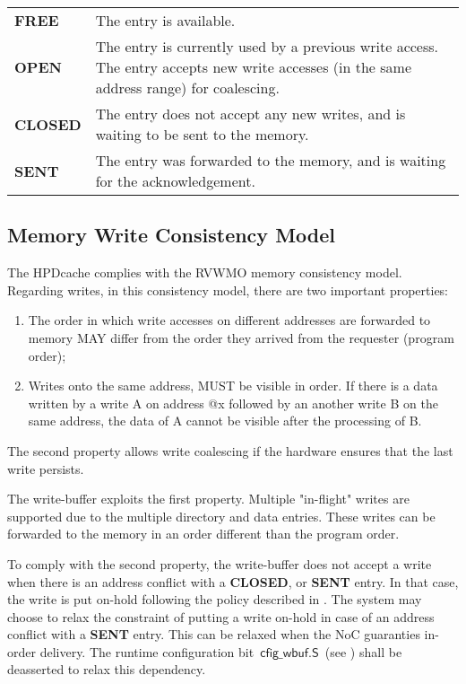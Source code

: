 \documentclass[10pt,titlepage,twoside]{book}
\begin{document}
\begin{center}
\begin{tabular}{lp{.8\linewidth}}
\textbf{FREE}   & The entry is available. \\
\textbf{OPEN}   & The entry is currently used by a previous write access.
The entry accepts new write accesses (in the same address range) for coalescing. \\
\textbf{CLOSED} & The entry does not accept any new writes, and is waiting to be sent to the memory. \\
\textbf{SENT}   & The entry was forwarded to the memory, and is waiting for the acknowledgement. \\
\end{tabular}
\end{center}

\subsection{Memory Write Consistency Model}

The \ac{HPDcache} complies with the \ac{RVWMO} memory consistency model.
Regarding writes, in this consistency model, there are two important properties:

\begin{enumerate}

\item The order in which write accesses on different addresses are forwarded to memory MAY differ from the order they arrived from the requester (program order);

\item Writes onto the same address, MUST be visible in order. If there is a data written by a write A on address @x followed by an another write B on the same address, the data of A cannot be visible after the processing of B.

\end{enumerate}

The second property allows write coalescing if the hardware ensures that the last write persists.

The write-buffer exploits the first property.
Multiple "in-flight" writes are supported due to the multiple directory and data entries.
These writes can be forwarded to the memory in an order different than the program order.

To comply with the second property, the write-buffer does not accept a write when there is an address conflict with a \textbf{CLOSED}, or \textbf{SENT} entry.
In that case, the write is put on-hold following the policy described in .
The system may choose to relax the constraint of putting a write on-hold in case of an address conflict with a \textbf{SENT} entry.
This can be relaxed when the \ac{NoC} guaranties in-order delivery.
The runtime configuration bit~$\mathsf{cfig\_wbuf.S}$~(see ) shall be deasserted to relax this dependency.
\end{document}
